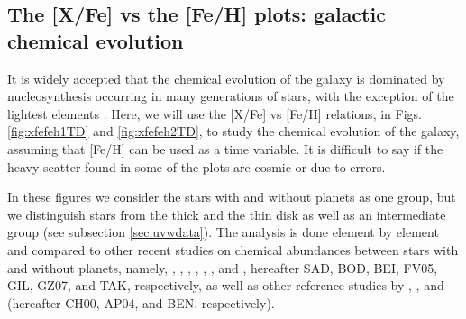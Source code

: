 \documentclass[oldversion]{aa}
\begin{document}



\subsection{The [X/Fe] vs the [Fe/H] plots: galactic chemical evolution}
\label{sec:galaxy}

It is widely accepted that the chemical evolution of the galaxy is dominated by nucleosynthesis occurring in many generations of stars, with the exception of the lightest elements \citep{McWilliam-1997}. Here, we will use the [X/Fe] vs [Fe/H] relations, in Figs. \ref{fig:xfefeh1TD} and \ref{fig:xfefeh2TD}, to study the chemical evolution of the galaxy, %
assuming that [Fe/H] can be used as a time variable.  %
It is difficult to say if the heavy scatter found in some of the plots are cosmic or due to errors.

In these figures we consider the stars with and without planets as one group, but we distinguish stars from the thick and the thin disk as well as an intermediate group (see subsection \ref{sec:uvwdata}). The analysis is done element by element and compared to other recent studies on chemical abundances between stars with and without planets, namely, \citet{Sadakane-2002},  \citet{Bodaghee-2003}, \citet{Beirao-2005}, \citet{Fischer-2005}, \citet{Gilli-2006}, \citet{Gonzalez-2007}, and \citet{Takeda-2007}, hereafter SAD, BOD, BEI, FV05, GIL, GZ07, and TAK, respectively, as well as other reference studies by \citet{Chen-2000}, \citet{Allende-2004}, and \citet{Bensby-2005} (hereafter CH00, AP04, and BEN, respectively). %
\end{document}
